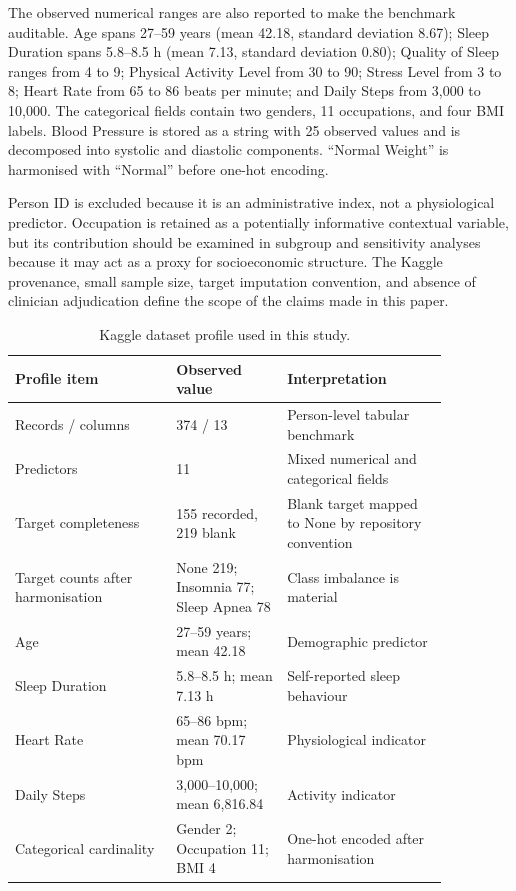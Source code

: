 ﻿\documentclass[preprint,12pt]{elsarticle}
\begin{document}
The observed numerical ranges are also reported to make the benchmark auditable. Age spans 27--59 years (mean 42.18, standard deviation 8.67); Sleep Duration spans 5.8--8.5 h (mean 7.13, standard deviation 0.80); Quality of Sleep ranges from 4 to 9; Physical Activity Level from 30 to 90; Stress Level from 3 to 8; Heart Rate from 65 to 86 beats per minute; and Daily Steps from 3,000 to 10,000. The categorical fields contain two genders, 11 occupations, and four BMI labels. Blood Pressure is stored as a string with 25 observed values and is decomposed into systolic and diastolic components. ``Normal Weight'' is harmonised with ``Normal'' before one-hot encoding.

Person ID is excluded because it is an administrative index, not a physiological predictor. Occupation is retained as a potentially informative contextual variable, but its contribution should be examined in subgroup and sensitivity analyses because it may act as a proxy for socioeconomic structure. The Kaggle provenance, small sample size, target imputation convention, and absence of clinician adjudication define the scope of the claims made in this paper.

\begin{table}[t]
\centering
\caption{Kaggle dataset profile used in this study.}
\label{tab:datasetprofile}
\small
\begin{tabular}{p{0.32\linewidth}p{0.22\linewidth}p{0.32\linewidth}}
\toprule
Profile item & Observed value & Interpretation \\
\midrule
Records / columns & 374 / 13 & Person-level tabular benchmark \\
Predictors & 11 & Mixed numerical and categorical fields \\
Target completeness & 155 recorded, 219 blank & Blank target mapped to None by repository convention \\
Target counts after harmonisation & None 219; Insomnia 77; Sleep Apnea 78 & Class imbalance is material \\
Age & 27--59 years; mean 42.18 & Demographic predictor \\
Sleep Duration & 5.8--8.5 h; mean 7.13 h & Self-reported sleep behaviour \\
Heart Rate & 65--86 bpm; mean 70.17 bpm & Physiological indicator \\
Daily Steps & 3,000--10,000; mean 6,816.84 & Activity indicator \\
Categorical cardinality & Gender 2; Occupation 11; BMI 4 & One-hot encoded after harmonisation \\
\bottomrule
\end{tabular}
\end{table}
\end{document}
